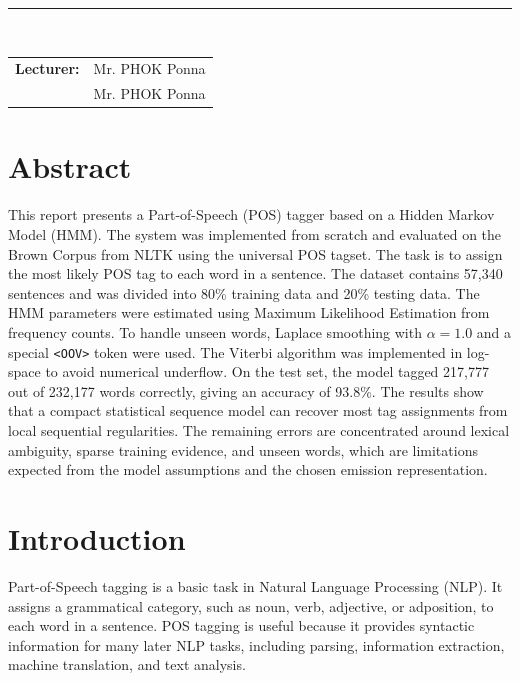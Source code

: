 \documentclass[12pt,a4paper]{article}
\begin{document}
\begin{titlepage}
\vfill

\noindent\rule{\linewidth}{0.4pt}\\[6pt]
\begin{minipage}[t]{0.55\textwidth}
  \raggedright
  \begin{tabular}{@{}l@{\enspace}l@{}}
    \textbf{Lecturer:} & Mr. PHOK Ponna \\
                       & Mr. PHOK Ponna \\
  \end{tabular}
\end{minipage}

\end{titlepage}

\clearpage
\hypersetup{pageanchor=true}

\tableofcontents
\clearpage
{}
\twocolumn

\section{Abstract}

This report presents a Part-of-Speech (POS) tagger based on a Hidden Markov Model
(HMM). The system was implemented from scratch and evaluated on the Brown Corpus
from NLTK using the universal POS tagset. The task is to assign the most likely
POS tag to each word in a sentence. The dataset contains 57,340 sentences and was
divided into 80\% training data and 20\% testing data. The HMM parameters were
estimated using Maximum Likelihood Estimation from frequency counts. To handle
unseen words, Laplace smoothing with $\alpha = 1.0$ and a special
\texttt{\textless OOV\textgreater} token were used. The Viterbi algorithm was
implemented in log-space to avoid numerical underflow. On the test set, the model
tagged 217,777 out of 232,177 words correctly, giving an accuracy of 93.8\%.
The results show that a compact statistical sequence model can recover most tag
assignments from local sequential regularities. The remaining errors are
concentrated around lexical ambiguity, sparse training evidence, and unseen
words, which are limitations expected from the model assumptions and the chosen
emission representation.

\section{Introduction}

Part-of-Speech tagging is a basic task in Natural Language Processing (NLP). It
assigns a grammatical category, such as noun, verb, adjective, or adposition, to
each word in a sentence. POS tagging is useful because it provides syntactic
information for many later NLP tasks, including parsing, information extraction,
machine translation, and text analysis.
\end{document}
